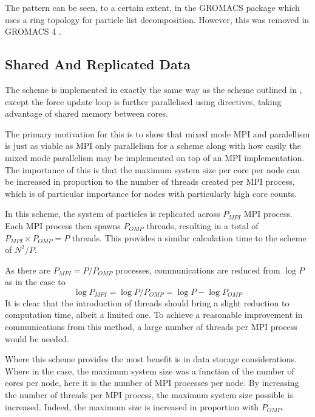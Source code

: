 The \systolicloop{} pattern can be seen, to a certain extent, in the
GROMACS \cite{berendsen1995gromacs} package which uses a ring
topology for particle list decomposition.
%
However, this was removed in GROMACS 4 \cite{hess2008gromacs}.



\subsection{Shared And Replicated Data}

The \sharedandreplicateddata{} scheme is implemented in exactly the same
way as the \replicateddata{} scheme outlined in 
,
except the force update loop is further
parallelised using \openmp{} directives, taking advantage of shared
memory between cores.

The primary motivation for this is to show that mixed mode MPI and \openmp{}
paralellism is just as viable as MPI only parallelism for a \replicateddata{}
scheme along with how easily the mixed mode parallelism may be implemented
on top of an MPI implementation.
%
The importance of this is that the maximum system size per core per node
can be increased in proportion to the number of \openmp{} threads
created per MPI process, which is of particular importance for nodes with
particularly high core counts.

In this scheme, the system of particles is replicated across
$P_{MPI}$ MPI process.
%
Each MPI process then spawns $P_{OMP}$ threads, resulting in a total
of $P_{MPI}\times{}P_{OMP} = P$ threads.
%
This provides a similar calculation time to the \replicateddata{} scheme
of $N^2/P$.

As there are $P_{MPI} = P/P_{OMP}$ processes, communications are
reduced from $\log{P}$ as in the \replicateddata{} case to
\begin{equation}
    \log{P_{MPI}} = \log{P/P_{OMP}} = \log{P} - \log{P_{OMP}}
\end{equation}
%
It is clear that the introduction of \openmp{} threads should
bring a slight reduction to computation time, albeit a limited one.
%
To achieve a reasonable improvement in communications from this method,
a large number of \openmp{} threads per MPI process would be needed.

Where this scheme provides the most benefit is in data storage considerations.
%
Where in the \replicateddata{} case, the maximum system size was a function
of the number of cores per node, here it is the number of MPI processes
per node.
%
By increasing the number of \openmp{} threads per MPI process,
the maximum system size possible is increased.
%
Indeed, the maximum size is increased in proportion with $P_{OMP}$.


